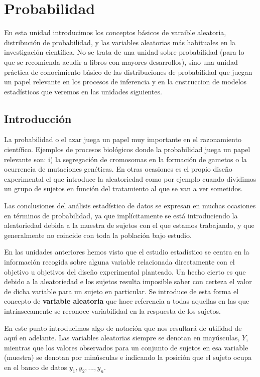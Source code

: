\documentclass[
]{book}
\begin{document}
\hypertarget{prob}{%
\chapter{Probabilidad}\label{prob}}

En esta unidad introducimos los conceptos básicos de varaible aleatoria, distribución de probabilidad, y las variables aleatorias más habituales en la investigación científica. No se trata de una unidad sobre probabilidad (para lo que se recomienda acudir a libros con mayores desarrollos), sino una unidad práctica de conocimiento básico de las distribuciones de probabilidad que juegan un papel relevante en los procesos de inferencia y en la cnstruccion de modelos estadísticos que veremos en las unidades siguientes.

\hypertarget{prob-intro}{%
\section{Introducción}\label{prob-intro}}

La probabilidad o el azar juega un papel muy importante en el razonamiento científico. Ejemplos de procesos biológicos donde la probabilidad juega un papel relevante son: i) la segregación de cromosomas en la formación de gametos o la ocurrencia de mutaciones genéticas. En otras ocasiones es el propio diseño experimental el que introduce la aleatoriedad como por ejemplo cuando dividimos un grupo de sujetos en función del tratamiento al que se van a ver sometidos.

Las conclusiones del análisis estadístico de datos se expresan en muchas ocasiones en términos de probabilidad, ya que implícitamente se está introduciendo la aleatoriedad debida a la muestra de sujetos con el que estamos trabajando, y que generalmente no coincide con toda la población bajo estudio.

En las unidades anteriores hemos visto que el estudio estadístico se centra en la información recogida sobre alguna variable relacionada directamente con el objetivo u objetivos del diseño experimental planteado. Un hecho cierto es que debido a la aleatoriedad e los sujetos resulta imposible saber con certeza el valor de dicha variable para un sujeto en particular. Se introduce de esta forma el concepto de \textbf{variable aleatoria} que hace referencia a todas aquellas en las que intrínsecamente se reconoce variabilidad en la respuesta de los sujetos.

En este punto introducimos algo de notación que nos resultará de utilidad de aquí en adelante. Las variables aleatorias siempre se denotan en mayúsculas, \(Y\), mientras que los valores observados para un conjunto de sujetos en esa variable (muestra) se denotan por minúsculas e indicando la posición que el sujeto ocupa en el banco de datos \(y_1,y_2,...,y_n\).
\end{document}
